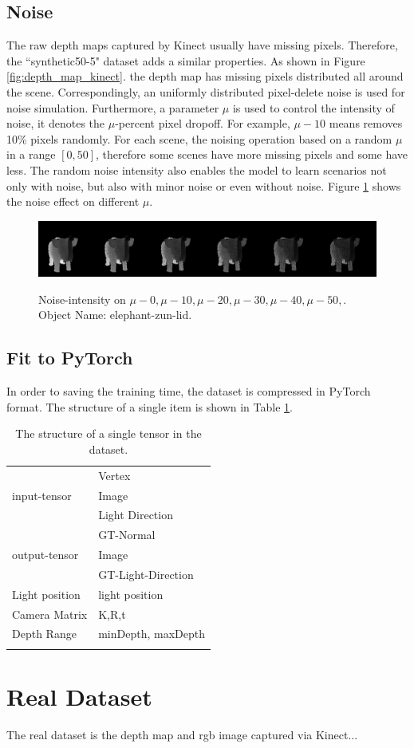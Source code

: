 \subsection{Noise}
\label{sec:noise}
The raw depth maps captured by Kinect usually have missing pixels. Therefore, the ``synthetic50-5" dataset adds a similar properties.
As shown in Figure \ref{fig:depth_map_kinect}. the depth map has missing pixels distributed all around the scene.  Correspondingly, an uniformly distributed pixel-delete noise is used for noise simulation. 
Furthermore, a parameter $ \mu $ is used to control the intensity of noise, it denotes the $ \mu $-percent pixel dropoff. For example, $ \mu-10 $ means removes 10\% pixels randomly. For each scene, the noising operation based on a random $ \mu $ in a range $ \left[0, 50\right] $, therefore some scenes have more missing pixels and some have less. The random noise intensity also enables the model to learn scenarios not only with noise, but also with minor noise or even without noise.
Figure \ref{fig:noise-intensity} shows the noise effect on different $ \mu $.
\begin{figure}[!h]
	\centering
	{\includegraphics[width=.9\textwidth]{./Figures/add_noise_depth.png}}
	\decoRule	
	\caption{Noise-intensity on $ \mu-0, \mu-10,\mu-20, \mu-30, \mu-40, \mu-50,$. Object Name: elephant-zun-lid.}
	\label{fig:noise-intensity}
\end{figure}


\subsection{Fit to PyTorch}
In order to saving the training time, the dataset is compressed in PyTorch format. The structure of a single item is shown in Table \ref{tab:tensor-structure}.
\begin{table}
	\caption{The structure of a single tensor in the dataset.}
	\label{tab:tensor-structure}
	\centering
	\begin{tabular}{l l}
		\toprule
		\tabhead{Name} & \tabhead{Content} \\
		\midrule
		\multirow{3}{*}{input-tensor}  & Vertex \\  & Image \\  & Light Direction \\
		\hline
		\multirow{3}{*}{output-tensor}  & GT-Normal \\ & Image \\ & GT-Light-Direction \\
		\hline
		Light position & light position \\
		\hline 
		Camera Matrix  & K,R,t\\
		\hline 
		Depth Range  & minDepth, maxDepth\\
		\bottomrule\\
	\end{tabular}
\end{table}




\section{Real Dataset}

The real dataset is the depth map and rgb image captured via Kinect...

